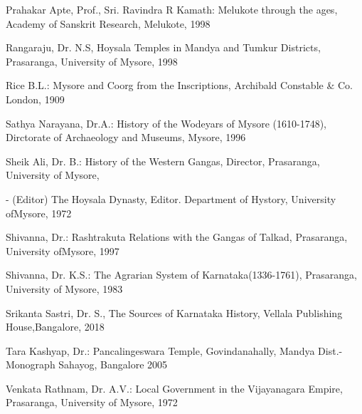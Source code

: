 \vskip -2pt

\noindent
Prahakar Apte, Prof., Sri. Ravindra R Kamath: Melukote through the ages, Academy of Sanskrit Research, Melukote, 1998

\vskip -2pt

\noindent
Rangaraju, Dr. N.S, Hoysala Temples in Mandya and Tumkur Districts, Prasaranga, University of Mysore, 1998

\vskip -2pt

\noindent
Rice B.L.: Mysore and Coorg from the Inscriptions, Archibald Constable \& Co. London, 1909

\vskip -2pt

\noindent
Sathya Narayana, Dr.A.: History of the Wodeyars of Mysore (1610-1748), Dirctorate of Archaeology and Museums, Mysore, 1996

\vskip -2pt

\noindent
Sheik Ali, Dr. B.: History of the Western Gangas, Director, Prasaranga, University of Mysore,

\vskip -2pt

- (Editor) The Hoysala Dynasty, Editor. Department of Hystory, University of\break Mysore, 1972

\vskip -2pt

\noindent
Shivanna, Dr.: Rashtrakuta Relations with the Gangas of Talkad, Prasaranga, University of\break Mysore, 1997

\vskip -2pt

\noindent
Shivanna, Dr. K.S.: The Agrarian System of Karnataka(1336-1761), Prasaranga, University of Mysore, 1983

\vskip -2pt

\noindent
Srikanta Sastri, Dr. S., The Sources of Karnataka History, Vellala Publishing House,\break Bangalore, 2018

\vskip -2pt

\noindent
Tara Kashyap, Dr.: Pancalingeswara Temple, Govindanahally, Mandya Dist.- Monograph Sahayog, Bangalore 2005

\vskip -2pt

\noindent
Venkata Rathnam, Dr. A.V.: Local Government in the Vijayanagara Empire, Prasaranga, University of Mysore, 1972


